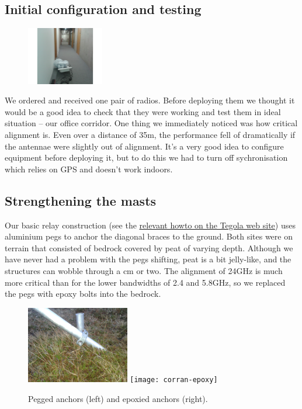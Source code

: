 \subsection{Initial configuration and testing}
\label{december-2013-initial-configuration-and-testing}

\begin{figure}
\includegraphics[width=0.3\textwidth]{radio-in-corridor}
\end{figure}
We ordered and received one pair of radios. Before deploying them
we thought it would be a good idea to check that they were working
and test them in ideal situation -- our office corridor. One thing
we immediately noticed was how critical alignment is. Even over
a distance of 35m, the performance fell of dramatically if the
antennae were slightly out of alignment. It's a very good idea to
configure equipment before deploying it, but to do this we had to turn
off sychronisation which relies on GPS and doesn't work indoors.

\subsection{Strengthening the masts}
\label{december-2013-january-2014-strengthening-the-relays}

Our basic relay construction (see the
\href{http://www.tegola.org.uk/howto/relay-construction.html}{relevant
  howto on the Tegola web site}) uses aluminium pegs to anchor the
diagonal braces to the ground. Both sites were on terrain that
consisted of bedrock covered by peat of varying depth. Although we
have never had a problem with the pegs shifting, peat is a bit
jelly-like, and the structures can wobble through a cm or two. The
alignment of 24GHz is much more critical than for the lower bandwidths
of 2.4 and 5.8GHz, so we replaced the pegs with epoxy bolts into the
bedrock.
\begin{figure}[h]
\includegraphics[width=0.4\textwidth]{corran-peg}
\texttt{[image: corran-epoxy]}
\caption{Pegged anchors (left) and epoxied anchors (right).}
\end{figure}

